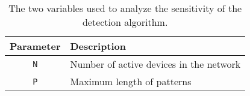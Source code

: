 \begin{table}[H]
    \caption{The two variables used to analyze the sensitivity of the detection algorithm.}
    \label{tab:parameters}
    \centering
    \begin{tabular}{|c|l|}
    \hline
    \textbf{Parameter} & \textbf{Description}             \\ \hline
    \texttt{N}         & Number of active devices in the network \\ \hline
    \texttt{P}         & Maximum length of patterns       \\ \hline
    \end{tabular}
\end{table}